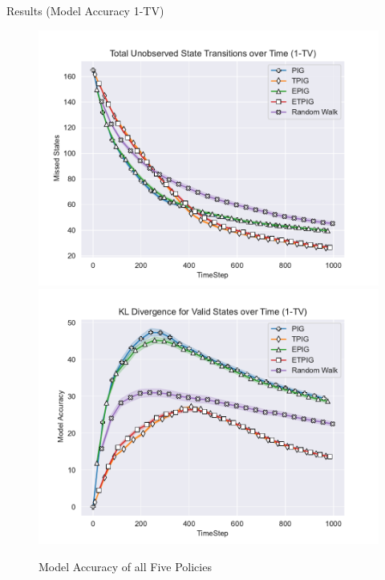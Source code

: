 	\begin{frame}[fragile]{Results (Model Accuracy 1-TV)}
		\begin{figure}
			\begin{center}
				\includegraphics[scale=0.40]{"../images/Missed_States_1-TV.pdf"}
				\includegraphics[scale=0.40]{"../images/Model_Accuracy_1-TV.pdf"}
			\end{center}
			\caption{Model Accuracy of all Five Policies}
		\end{figure}
	\end{frame}
	
	
